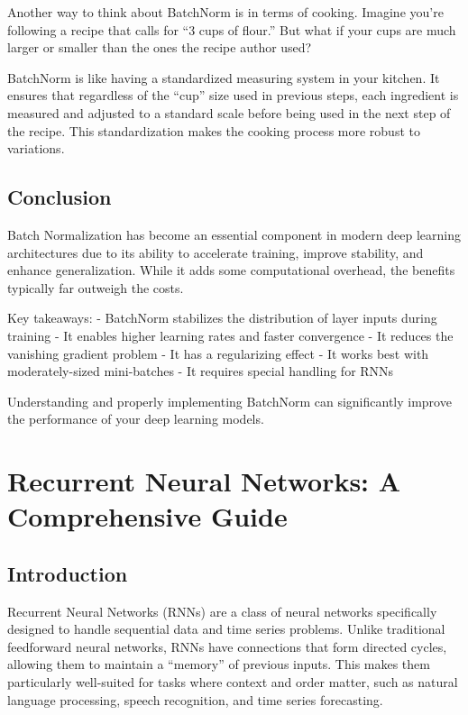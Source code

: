 \documentclass[
  letterpaper,
  DIV=11,
  numbers=noendperiod]{scrreprt}
\begin{document}
Another way to think about BatchNorm is in terms of cooking. Imagine
you're following a recipe that calls for ``3 cups of flour.'' But what
if your cups are much larger or smaller than the ones the recipe author
used?

BatchNorm is like having a standardized measuring system in your
kitchen. It ensures that regardless of the ``cup'' size used in previous
steps, each ingredient is measured and adjusted to a standard scale
before being used in the next step of the recipe. This standardization
makes the cooking process more robust to variations.

\subsection{Conclusion}\label{conclusion-4}

Batch Normalization has become an essential component in modern deep
learning architectures due to its ability to accelerate training,
improve stability, and enhance generalization. While it adds some
computational overhead, the benefits typically far outweigh the costs.

Key takeaways: - BatchNorm stabilizes the distribution of layer inputs
during training - It enables higher learning rates and faster
convergence - It reduces the vanishing gradient problem - It has a
regularizing effect - It works best with moderately-sized mini-batches -
It requires special handling for RNNs

Understanding and properly implementing BatchNorm can significantly
improve the performance of your deep learning models.

\section{Recurrent Neural Networks: A Comprehensive
Guide}\label{recurrent-neural-networks-a-comprehensive-guide}

\subsection{Introduction}\label{introduction-2}

Recurrent Neural Networks (RNNs) are a class of neural networks
specifically designed to handle sequential data and time series
problems. Unlike traditional feedforward neural networks, RNNs have
connections that form directed cycles, allowing them to maintain a
``memory'' of previous inputs. This makes them particularly well-suited
for tasks where context and order matter, such as natural language
processing, speech recognition, and time series forecasting.
\end{document}
